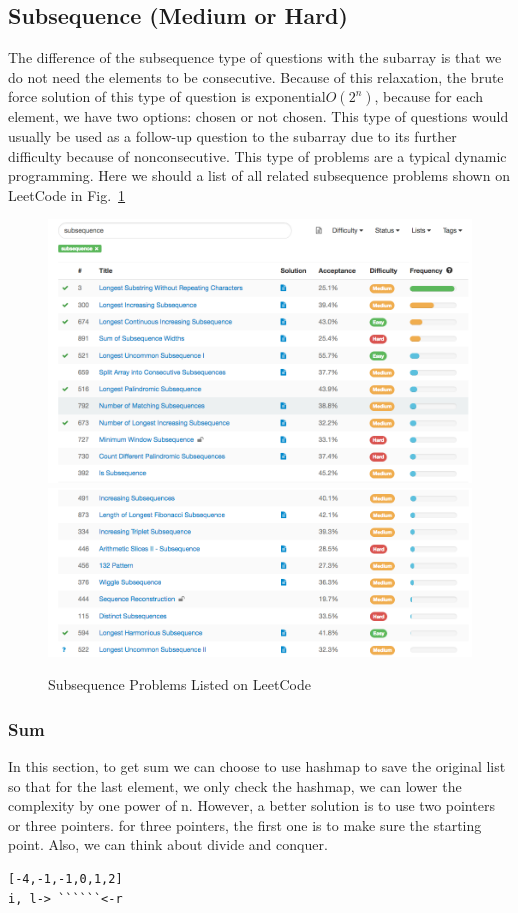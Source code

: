 \documentclass[../specific-algorithms.tex]{subfiles}
\begin{document}
\subsection{Subsequence (Medium or Hard)}
The difference of the subsequence type of questions with the subarray is that we do not need the elements to be consecutive. Because of this relaxation, the brute force solution of this type of question is exponential$O(2^n)$, because for each element, we have two options: chosen or not chosen. This type of questions would usually be used as a follow-up question to the subarray due to its further difficulty because of nonconsecutive. This type of problems are a typical dynamic programming. Here we should a list of all related subsequence problems shown on LeetCode in Fig.~\ref{fig:subsequence_problems}
\begin{figure}[h]
    \centering
    \includegraphics[width=0.8\columnwidth]{fig/subsequence_1.png}
    \includegraphics[width=0.8\columnwidth]{fig/subsequence_2.png}
    \caption{Subsequence Problems Listed on LeetCode}
    \label{fig:subsequence_problems}
\end{figure}

\subsubsection{Sum}
In this section, to get sum we can choose to use hashmap to save the original list so that for the last element, we only check the hashmap, we can lower the complexity by one power of n. However, a better solution is to use two pointers or three pointers. for three pointers, the first one is to make sure the starting point. Also, we can think about divide and conquer.
\begin{lstlisting}
[-4,-1,-1,0,1,2]
i, l-> ``````<-r
\end{lstlisting}
\end{document}
